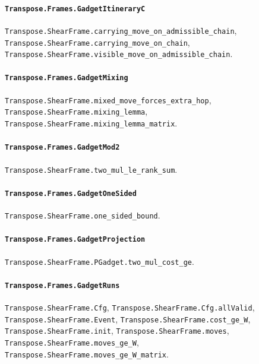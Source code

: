 \paragraph{\texttt{Transpose.Frames.GadgetItineraryC}}
{\small\raggedright \texttt{Transpose.ShearFrame.carrying\_move\_on\_admissible\_chain}, \texttt{Transpose.ShearFrame.carrying\_move\_on\_chain}, \texttt{Transpose.ShearFrame.visible\_move\_on\_admissible\_chain}.\par}

\paragraph{\texttt{Transpose.Frames.GadgetMixing}}
{\small\raggedright \texttt{Transpose.ShearFrame.mixed\_move\_forces\_extra\_hop}, \texttt{Transpose.ShearFrame.mixing\_lemma}, \texttt{Transpose.ShearFrame.mixing\_lemma\_matrix}.\par}

\paragraph{\texttt{Transpose.Frames.GadgetMod2}}
{\small\raggedright \texttt{Transpose.ShearFrame.two\_mul\_le\_rank\_sum}.\par}

\paragraph{\texttt{Transpose.Frames.GadgetOneSided}}
{\small\raggedright \texttt{Transpose.ShearFrame.one\_sided\_bound}.\par}

\paragraph{\texttt{Transpose.Frames.GadgetProjection}}
{\small\raggedright \texttt{Transpose.ShearFrame.PGadget.two\_mul\_cost\_ge}.\par}

\paragraph{\texttt{Transpose.Frames.GadgetRuns}}
{\small\raggedright \texttt{Transpose.ShearFrame.Cfg}, \texttt{Transpose.ShearFrame.Cfg.allValid}, \texttt{Transpose.ShearFrame.Event}, \texttt{Transpose.ShearFrame.cost\_ge\_W}, \texttt{Transpose.ShearFrame.init}, \texttt{Transpose.ShearFrame.moves}, \texttt{Transpose.ShearFrame.moves\_ge\_W}, \texttt{Transpose.ShearFrame.moves\_ge\_W\_matrix}.\par}

